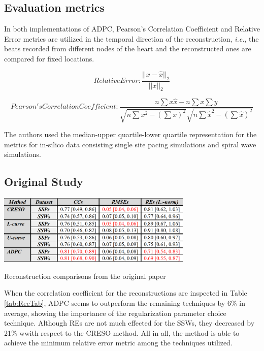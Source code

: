 \documentclass[draftcls, onecolumn, journal]{IEEEtran}
\begin{document}
\subsection{Evaluation metrics}

In both implementations of ADPC, Pearson's Correlation Coefficient and Relative Error metrics are utilized in the temporal direction of the reconstruction, \textit{i.e.}, the beats recorded from different nodes of the heart and the reconstructed ones are compared for fixed locations. 

\begin{equation}
    Relative Error: \frac{||x-\hat{x}||_2}{||x||_2}
\end{equation}

\begin{equation}
    Pearson's Correlation Coefficient: \frac{n\sum x \hat{x} - n \sum x \sum y}{\sqrt{n\sum x^2 - (\sum x)^2}\sqrt{n\sum {\hat{x}}^2 - (\sum \hat{x})^2}}
\end{equation}

The authors used the median-upper quartile-lower quartile representation for the metrics for in-silico data consisting single site pacing simulations and spiral wave simulations. 

\newpage

\subsection{Original Study}

\begin{table}[h]
\centering
\includegraphics[width=0.7\textwidth]{../images/RecTable.png}
\caption{\label{tab:RecTab}Reconstruction comparisons from the original paper}
\end{table}

When the correlation coefficient for the reconstructions are inspected in Table \ref{tab:RecTab}, ADPC seems to outperform the remaining techniques by 6\% in average, showing the importance of the regularization parameter choice technique. Although REs are not much effected for the SSWs, they decreased by 21\% wwith respect to the CRESO method. All in all, the method is able to achieve the minimum relative error metric among the techniques utilized.
\end{document}
